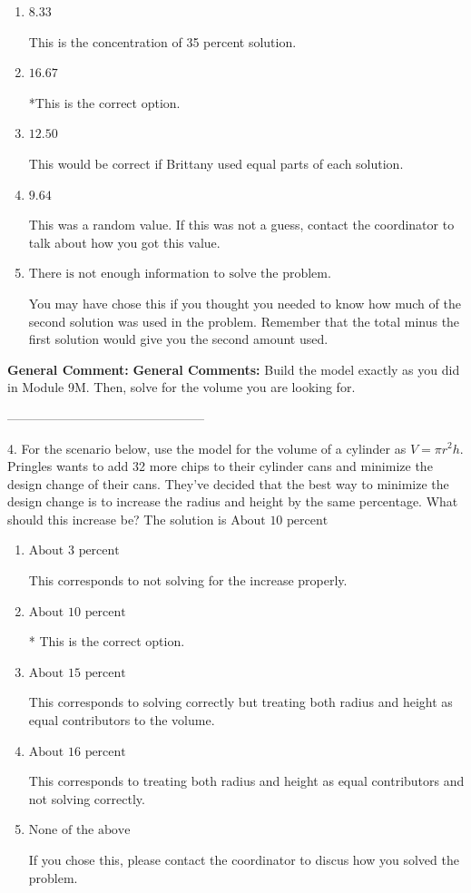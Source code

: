 \documentclass{extbook}[14pt]
\begin{document}
\begin{enumerate}[label=\Alph*.] 
\item $ 8.33 $ 

 This is the concentration of 35 percent solution. 
\item $ 16.67 $ 

 *This is the correct option. 
\item $ 12.50 $ 

 This would be correct if Brittany used equal parts of each solution. 
\item $ 9.64 $ 

 This was a random value. If this was not a guess, contact the coordinator to talk about how you got this value. 
\item $ \text{There is not enough information to solve the problem.} $ 

 You may have chose this if you thought you needed to know how much of the second solution was used in the problem. Remember that the total minus the first solution would give you the second amount used. 
\end{enumerate} 
 
\textbf{General Comment:} \textbf{General Comments:} Build the model exactly as you did in Module 9M. Then, solve for the volume you are looking for. 

-----------------------------------------------

4. For the scenario below, use the model for the volume of a cylinder as $V = \pi r^2 h$.
Pringles wants to add 32  more chips to their cylinder cans and minimize the design change of their cans. They've decided that the best way to minimize the design change is to increase the radius and height by the same percentage. What should this increase be? 
The solution is $ \text{About } 10 \text{ percent} $ 

\begin{enumerate}[label=\Alph*.] 
\item $ \text{About } 3 \text{ percent} $ 

 This corresponds to not solving for the increase properly. 
\item $ \text{About } 10 \text{ percent} $ 

 * This is the correct option. 
\item $ \text{About } 15 \text{ percent} $ 

 This corresponds to solving correctly but treating both radius and height as equal contributors to the volume. 
\item $ \text{About } 16 \text{ percent} $ 

 This corresponds to treating both radius and height as equal contributors and not solving correctly. 
\item $ \text{None of the above} $ 

 If you chose this, please contact the coordinator to discus how you solved the problem. 
\end{enumerate} 
 
\end{document}
